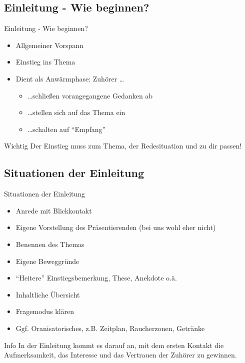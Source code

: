 \subsection{Einleitung - Wie beginnen?}
\begin{frame}{Einleitung - Wie beginnen?}
    \begin{itemize}[<+->]
        \item Allgemeiner Vorspann
        \item Einstieg ins Thema
        \item Dient als Anwärmphase: Zuhörer \dots
           \begin{itemize}[<+->]
            \item \dots schließen vorangegangene Gedanken ab
            \item \dots stellen sich auf das Thema ein
            \item \dots schalten auf "`Empfang"'
           \end{itemize}
    \end{itemize}

    \pause[\thebeamerpauses]
    \begin{alertblock}{Wichtig}
        Der Einstieg muss zum Thema, der Redesituation und zu dir
        passen!
    \end{alertblock}
\end{frame}

\subsection{Situationen der Einleitung}
\begin{frame}{Situationen der Einleitung}
    \begin{itemize}[<+->]
        \item Anrede mit Blickkontakt
        \item Eigene Vorstellung des Präsentierenden (bei uns wohl eher nicht)
        \item Benennen des Themas
        \item Eigene Beweggründe
        \item "`Heitere"' Einstiegsbemerkung, These, Anekdote o.ä.
        \item Inhaltliche Übersicht
        \item Fragemodus klären
        \item Ggf. Oranisatorisches, z.B. Zeitplan, Raucherzonen, Getränke
    \end{itemize}

    \pause[\thebeamerpauses]
    \begin{block}{Info}
        In der Einleitung kommt es darauf an, mit dem ersten Kontakt
        die Aufmerksamkeit, das Interesse und das Vertrauen der
        Zuhörer zu gewinnen.
    \end{block}
\end{frame}

